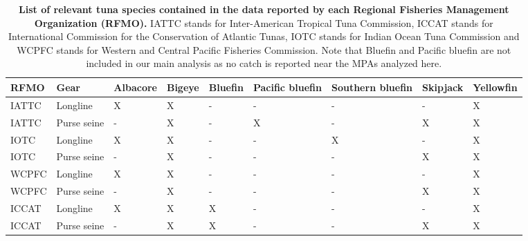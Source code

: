 \begin{table}
\centering
\caption{\label{tab:rfmo_spp}\textbf{List of relevant tuna species contained in the data reported
      by each Regional Fisheries Management Organization (RFMO).} IATTC stands for Inter-American Tropical Tuna Commission,
      ICCAT stands for International Commission for the Conservation of Atlantic Tunas, IOTC stands for Indian Ocean Tuna
      Commission and WCPFC stands for Western and Central Pacific Fisheries Commission.
      Note that Bluefin and Pacific bluefin are not included in our main analysis as no catch is reported near the MPAs analyzed here.}
\centering
\begin{tabular}[t]{lllllllll}
\toprule
RFMO & Gear & Albacore & Bigeye & Bluefin & Pacific bluefin & Southern bluefin & Skipjack & Yellowfin\\
\midrule
IATTC & Longline & X & X & - & - & - & - & X\\
IATTC & Purse seine & - & X & - & X & - & X & X\\
IOTC & Longline & X & X & - & - & X & - & X\\
IOTC & Purse seine & - & X & - & - & - & X & X\\
WCPFC & Longline & X & X & - & - & - & - & X\\
WCPFC & Purse seine & - & X & - & - & - & X & X\\
ICCAT & Longline & X & X & X & - & - & - & X\\
ICCAT & Purse seine & - & X & X & - & - & X & X\\
\bottomrule
\end{tabular}
\end{table}
